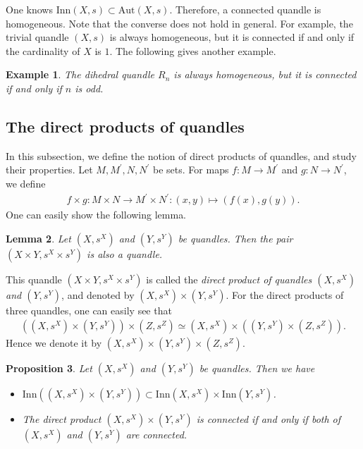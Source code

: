 \documentclass[12pt]{amsart}
\newtheorem{Prop}{Proposition}[section]
\newtheorem{Lem}[Prop]{Lemma}
\newtheorem{Ex}[Prop]{Example}
\theoremstyle{definition}
\begin{document}
One knows $ {\mathrm{Inn}}(X,s) \subset {\mathrm{Aut}}(X,s) $. Therefore, a connected quandle is homogeneous. Note that the converse does not hold in general. For example, the trivial quandle $ (X,s) $ is always homogeneous, but it is connected if and only if the cardinality of $ X $ is $ 1 $. The following gives another example.

\begin{Ex}\label{Ex2.7}
The dihedral quandle $ R_{n} $ is always homogeneous, but it is connected if and only if $ n $ is odd.
\end{Ex}

\subsection{The direct products of quandles}

In this subsection, we define the notion of direct products of quandles, and study their properties. Let $ M, M^{\prime}, N, N^{\prime} $ be sets. For maps $ f : M \rightarrow M^{\prime} $ and $ g : N \rightarrow N^{\prime} $, we define
\begin{align*}
f \times g : M \times N \rightarrow M^{\prime} \times N^{\prime} : (x,y) \mapsto (f(x),g(y)).
\end{align*}
One can easily show the following lemma.

\begin{Lem}\label{Lem2.8}
Let $ (X,s^{X}) $ and $ (Y,s^{Y}) $ be quandles. Then the pair $ (X \times Y , s^{X} \times s^{Y}) $ is also a quandle.
\end{Lem}

This quandle $ (X \times Y , s^{X} \times s^{Y}) $ is called the \textit{direct product of quandles $ (X,s^{X}) $ and $ (Y,s^{Y}) $}, and denoted by $ (X,s^{X}) \times (Y,s^{Y}) $. For the direct products of three quandles, one can easily see that 
\begin{align*}
((X,s^{X}) \times (Y,s^{Y})) \times (Z,s^{Z}) \simeq (X,s^{X}) \times ((Y,s^{Y}) \times (Z,s^{Z})).
\end{align*}
Hence we denote it by $ (X,s^{X}) \times (Y,s^{Y}) \times (Z,s^{Z}) $.

\begin{Prop}\label{Prop2.9}
Let $ (X,s^{X}) $ and $ (Y,s^{Y}) $ be quandles. Then we have
\begin{itemize}
\item[(1)]
$ {\mathrm{Inn}}((X,s^{X}) \times (Y,s^{Y})) \subset {\mathrm{Inn}}(X,s^{X}) \times {\mathrm{Inn}}(Y,s^{Y}) $.
\item[(2)]
The direct product $ (X,s^{X}) \times (Y,s^{Y}) $ is connected if and only if both of $ (X,s^{X}) $ and $ (Y,s^{Y}) $ are connected.
\end{itemize}
\end{Prop}
\end{document}
